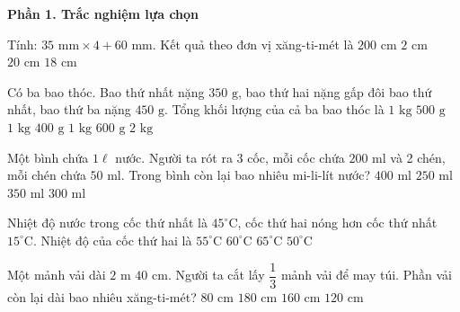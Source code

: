 \textbf{Phần 1. Trắc nghiệm lựa chọn}

\begin{ex} %
Tính: $35\text{ mm} \times 4 + 60\text{ mm}$. Kết quả theo đơn vị xăng-ti-mét là
\choice
{$200\text{ cm}$}
{$2\text{ cm}$}
{\True $20\text{ cm}$}
{$18\text{ cm}$}
\end{ex}

\begin{ex} %
Có ba bao thóc. Bao thứ nhất nặng $350\text{ g}$, bao thứ hai nặng gấp đôi bao thứ nhất, bao thứ ba nặng $450\text{ g}$. Tổng khối lượng của cả ba bao thóc là
\choice
{\True $1\text{ kg } 500\text{ g}$}
{$1\text{ kg } 400\text{ g}$}
{$1\text{ kg } 600\text{ g}$}
{$2\text{ kg}$}
\end{ex}

\begin{ex} %
Một bình chứa $1\ell$ nước. Người ta rót ra 3 cốc, mỗi cốc chứa $200\text{ ml}$ và 2 chén, mỗi chén chứa $50\text{ ml}$. Trong bình còn lại bao nhiêu mi-li-lít nước?
\choice
{$400\text{ ml}$}
{$250\text{ ml}$}
{$350\text{ ml}$}
{\True $300\text{ ml}$}
\end{ex}

\begin{ex} %
Nhiệt độ nước trong cốc thứ nhất là $45^\circ\text{C}$, cốc thứ hai nóng hơn cốc thứ nhất $15^\circ\text{C}$. Nhiệt độ của cốc thứ hai là
\choice
{$55^\circ\text{C}$}
{\True $60^\circ\text{C}$}
{$65^\circ\text{C}$}
{$50^\circ\text{C}$}
\end{ex}

\begin{ex} %
Một mảnh vải dài $2\text{ m } 40\text{ cm}$. Người ta cắt lấy $\dfrac{1}{3}$ mảnh vải để may túi. Phần vải còn lại dài bao nhiêu xăng-ti-mét?
\choice
{$80\text{ cm}$}
{$180\text{ cm}$}
{\True $160\text{ cm}$}
{$120\text{ cm}$}
\end{ex}

